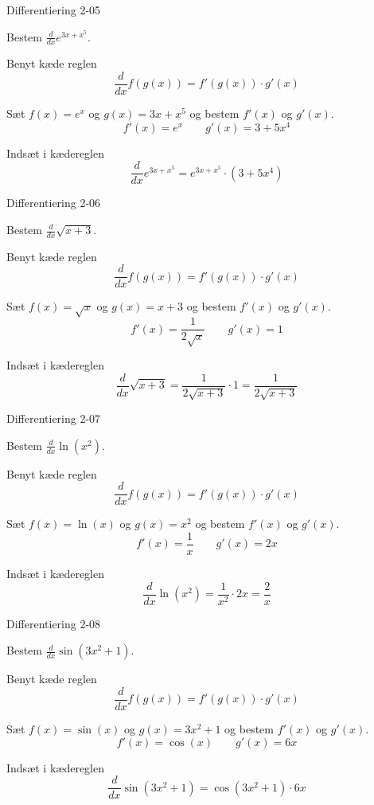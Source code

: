 \documentclass{article}
\begin{document}
\begin{exercise}{Differentiering 2-05}

Bestem $\frac{d}{dx} e^{3x + x^5}$.


\hint
Benyt kæde reglen
\[
\frac{d}{dx} f(g(x)) = f'(g(x)) \cdot g'(x)
\]

\hint
Sæt $f(x) = e^x$ og $g(x) = 3x + x^5$ og bestem $f'(x)$ og $g'(x)$.
\[
f'(x) = e^x \qquad g'(x) = 3 + 5 x^4
\]

\hint
Indsæt i kædereglen
\[
\frac{d}{dx} e^{3x + x^5} = e^{3x + x^5} \cdot (3 + 5x^4)
\]

\end{exercise}

\begin{exercise}{Differentiering 2-06}

Bestem $\frac{d}{dx} \sqrt{x + 3}$.


\hint
Benyt kæde reglen
\[
\frac{d}{dx} f(g(x)) = f'(g(x)) \cdot g'(x)
\]

\hint
Sæt $f(x) = \sqrt{x}$ og $g(x) = x + 3$ og bestem $f'(x)$ og $g'(x)$.
\[
f'(x) =\frac{1}{2 \sqrt{x}} \qquad g'(x) = 1
\]

\hint
Indsæt i kædereglen
\[
\frac{d}{dx} \sqrt{x + 3} = \frac{1}{2 \sqrt{x + 3}} \cdot 1 = \frac{1}{2 \sqrt{x + 3 }}
\]

\end{exercise}

\begin{exercise}{Differentiering 2-07}

Bestem $\frac{d}{dx} \ln(x^2)$.


\hint
Benyt kæde reglen
\[
\frac{d}{dx} f(g(x)) = f'(g(x)) \cdot g'(x)
\]

\hint
Sæt $f(x) = \ln(x)$ og $g(x) = x^2$ og bestem $f'(x)$ og $g'(x)$.
\[
f'(x) = \frac{1}{x} \qquad g'(x) = 2x
\]

\hint
Indsæt i kædereglen
\[
\frac{d}{dx} \ln(x^2) = \frac{1}{x^2} \cdot 2x = \frac{2}{x}
\]

\end{exercise}

\begin{exercise}{Differentiering 2-08}

Bestem $\frac{d}{dx} \sin(3x^2 + 1)$.


\hint
Benyt kæde reglen
\[
\frac{d}{dx} f(g(x)) = f'(g(x)) \cdot g'(x)
\]

\hint
Sæt $f(x) = \sin(x)$ og $g(x) = 3x^2 + 1$ og bestem $f'(x)$ og $g'(x)$.
\[
f'(x) = \cos(x) \qquad g'(x) = 6x
\]

\hint
Indsæt i kædereglen
\[
\frac{d}{dx} \sin(3x^2 + 1) = \cos(3x^2 + 1) \cdot 6x
\]

\end{exercise}
\end{document}

